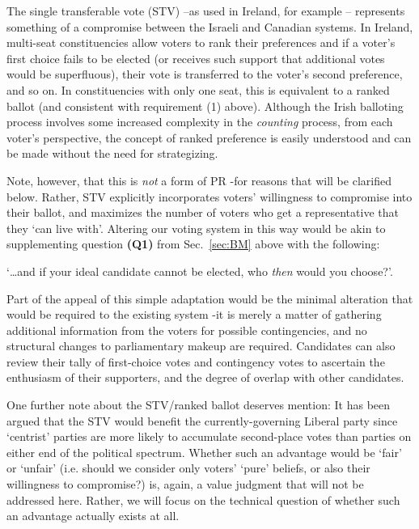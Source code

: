 \documentclass[DIV=calc, paper=a4, fontsize=11pt, twocolumn]{scrartcl}	 %
\begin{document}
The single transferable vote (STV) \---as used in Ireland, for example\cite{Irish_howto_vote_doc}
\--- represents something of a compromise between the Israeli and Canadian systems. In Ireland, multi-seat constituencies allow voters to  rank their preferences and if a voter's first choice fails to be elected (or receives such support that additional votes would be superfluous), their vote is transferred to the voter's second preference, and so on. In constituencies with only one seat, this is equivalent to a ranked ballot (and consistent with requirement (1) above). 
Although the Irish balloting process involves some increased complexity in the \emph{counting} process, from each voter's perspective, the concept of ranked preference is easily understood and can be made without the need for strategizing.

Note, however, that this is \emph{not} a form of PR \--for reasons that will be clarified below. 
Rather, STV explicitly incorporates voters' willingness to compromise into their ballot, and maximizes the number of voters who get a representative that they `can live with'.
Altering our voting system in this way would be akin to supplementing question \textbf{(Q1)} from Sec.~\ref{sec:BM} above with the following: 

\begin{tcolorbox}[colback=white!5!white,colframe=blue!55!black]
`\ldots and if your ideal candidate cannot be elected, who \emph{then} would you choose?'. 
\end{tcolorbox}

Part of the appeal of this simple adaptation would be the minimal alteration that would be required to the existing system \--it is merely a matter of gathering additional information from the voters for possible contingencies, and no structural changes to parliamentary makeup are required. Candidates can also review their tally of first-choice votes and contingency votes to ascertain the enthusiasm of their supporters, and the degree of overlap with other candidates. 

One further note about the STV/ranked ballot deserves mention: It has been argued\cite{Record}
 that the STV would benefit the currently-governing Liberal party since  `centrist' parties are more likely to accumulate second-place votes than parties on either end of the political spectrum. 
Whether such an advantage would be `fair' or `unfair' (i.e. should we consider only voters' `pure' beliefs, or also their willingness to compromise?) is, again, a value judgment that will not be addressed here. Rather, we will focus on the technical question of whether such an advantage actually exists at all.
\end{document}
